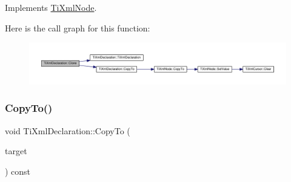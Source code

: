 Implements \hyperlink{class_ti_xml_node_a4508cc3a2d7a98e96a54cc09c37a78a4}{Ti\+Xml\+Node}.

Here is the call graph for this function\+:
\nopagebreak
\begin{figure}[H]
\begin{center}
\leavevmode
\includegraphics[width=350pt]{class_ti_xml_declaration_a35dc1455f69b79e81cae28e186944610_cgraph}
\end{center}
\end{figure}
\mbox{\label{class_ti_xml_declaration_a189de17b3e04d4e5b1c385336f214af1}} 
\subsubsection{\texorpdfstring{Copy\+To()}{CopyTo()}}
{\footnotesize\ttfamily void Ti\+Xml\+Declaration\+::\+Copy\+To (\begin{DoxyParamCaption}\item[{\hyperlink{class_ti_xml_declaration}{Ti\+Xml\+Declaration} $\ast$}]{target }\end{DoxyParamCaption}) const\hspace{0.3cm}{\ttfamily [protected]}}


